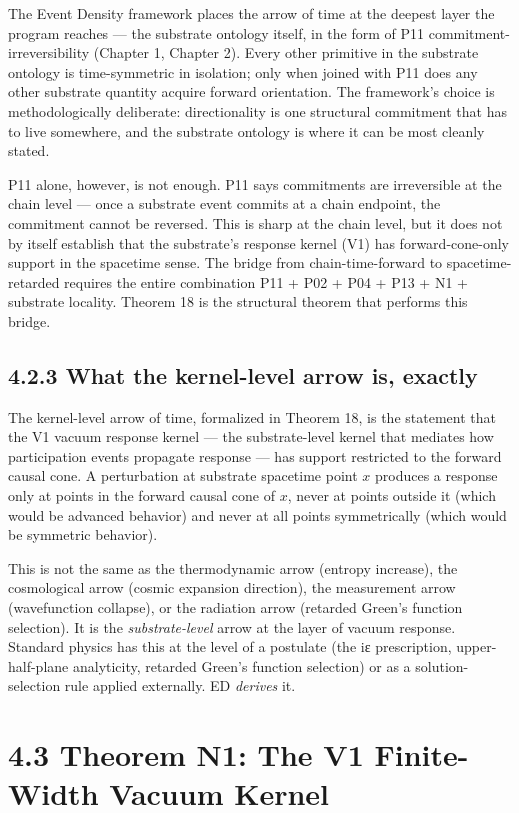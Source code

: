 \documentclass[11pt]{book}
\begin{document}
The Event Density framework places the arrow of time at the deepest layer the program reaches — the substrate ontology itself, in the form of P11 commitment-irreversibility (Chapter 1, Chapter 2). Every other primitive in the substrate ontology is time-symmetric in isolation; only when joined with P11 does any other substrate quantity acquire forward orientation. The framework's choice is methodologically deliberate: directionality is one structural commitment that has to live somewhere, and the substrate ontology is where it can be most cleanly stated.

P11 alone, however, is not enough. P11 says commitments are irreversible at the chain level — once a substrate event commits at a chain endpoint, the commitment cannot be reversed. This is sharp at the chain level, but it does not by itself establish that the substrate's response kernel (V1) has forward-cone-only support in the spacetime sense. The bridge from chain-time-forward to spacetime-retarded requires the entire combination P11 + P02 + P04 + P13 + N1 + substrate locality. Theorem 18 is the structural theorem that performs this bridge.

\subsection{4.2.3 What the kernel-level arrow is, exactly}

The kernel-level arrow of time, formalized in Theorem 18, is the statement that the V1 vacuum response kernel — the substrate-level kernel that mediates how participation events propagate response — has support restricted to the forward causal cone. A perturbation at substrate spacetime point $x$ produces a response only at points in the forward causal cone of $x$, never at points outside it (which would be advanced behavior) and never at all points symmetrically (which would be symmetric behavior).

This is not the same as the thermodynamic arrow (entropy increase), the cosmological arrow (cosmic expansion direction), the measurement arrow (wavefunction collapse), or the radiation arrow (retarded Green's function selection). It is the \textit{substrate-level} arrow at the layer of vacuum response. Standard physics has this at the level of a postulate (the iε prescription, upper-half-plane analyticity, retarded Green's function selection) or as a solution-selection rule applied externally. ED \textit{derives} it.

\section{4.3 Theorem N1: The V1 Finite-Width Vacuum Kernel}
\end{document}
